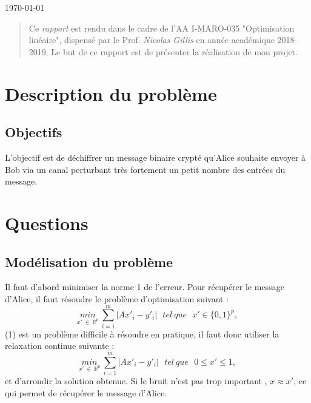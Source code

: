 \documentclass[]{article}
\newcommand{\placeholder}[1]{{\noindent \color{red}[ #1 ]}}
\begin{document}
\bigskip
\begin{center} \today \end{center}
\begin{abstract}
Ce \emph{rapport} est rendu dans le cadre de l'AA \textsf{I-MARO-035} "Optimisation linéaire", dispensé par le Prof. \emph{Nicolas Gillis} en année académique 2018-2019. Le but de ce rapport est de présenter la réalisation de mon projet.
\end{abstract}

\newpage
\section{Description du problème}\label{sec:intro}


\subsection{Objectifs}



L'objectif est de déchiffrer un message binaire crypté qu'Alice souhaite envoyer à Bob via un canal perturbant très fortement un petit nombre des entrées du message. 

\section{Questions}

\subsection{Modélisation du problème}
Il faut d'abord minimiser la norme 1 de l'erreur. Pour récupérer le message d'Alice, il faut résoudre le problème d'optimisation suivant : 
\begin{equation}
\underset{x' \ \in \ \mathbb{R}^{p}}{min} \ \sum_{i = 1}^{m} |Ax'_{i} - y'_{i}| \ \ \ tel \ que \ \ \ x' \in \lbrace 0,1 \rbrace^{p},  
\end{equation}
(1) est un problème difficile à résoudre en pratique, il faut donc utiliser la relaxation continue suivante : 
\begin{equation}
\underset{x' \ \in \ \mathbb{R}^{p}}{min} \ \sum_{i = 1}^{m} |Ax'_{i} - y'_{i}| \ \ \ tel \ que \ \ \ 0\leq x' \leq 1,  
\end{equation}
et d'arrondir la solution obtenue. Si le bruit n'est pas trop important , $x \approx  x' $, ce qui permet de récupérer le message d'Alice.
\end{document}
